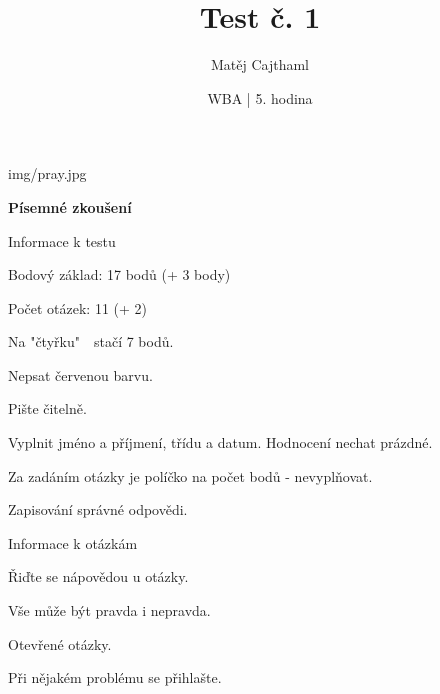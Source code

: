 \documentclass[aspectratio=1610]{beamer}
\title{Test č. 1}
\date{WBA | 5. hodina}
\author[Cajthaml]{Matěj Cajthaml}
\begin{document}
\begin{frame}
\titlepage
\end{frame}




\begin{frameImg}[width]{img/pray.jpg}
    \vspace*{60mm}
    \begin{cardTiny}
        \vspace*{\fill}
        \begin{center}
            \textbf{Písemné zkoušení}
        \end{center}
    \end{cardTiny}
\end{frameImg}


\begin{frame}{Informace k testu}
    \begin{cardTiny}
        \begin{flushleft}
            Bodový základ: 17 bodů (+ 3 body)

            Počet otázek: 11 (+ 2)

            Na "čtyřku"~~stačí 7 bodů.

            \vspace{2ex}

            Nepsat červenou barvu.

            Pište čitelně.

            \vspace{2ex}

            Vyplnit jméno a příjmení, třídu a datum. Hodnocení nechat prázdné.

            Za zadáním otázky je políčko na počet bodů - nevyplňovat.

            \vspace{2ex}
            Zapisování správné odpovědi.
        \end{flushleft}
    \end{cardTiny}
\end{frame}

\begin{frame}{Informace k otázkám}
    \begin{cardTiny}
        \begin{flushleft}
            Řiďte se nápovědou u otázky.

            Vše může být pravda i nepravda.  

            Otevřené otázky.
        \end{flushleft}
    \end{cardTiny}

    \begin{cardTiny}
        \begin{flushleft}
            Při nějakém problému se přihlašte.
        \end{flushleft}
    \end{cardTiny}
\end{frame}
\end{document}
